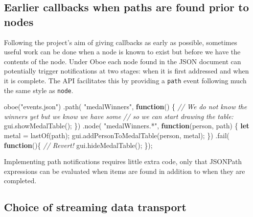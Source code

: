 \documentclass[12pt, ]{article}
\newenvironment{Shaded}{}{}
\newcommand{\KeywordTok}[1]{\textcolor[rgb]{0.00,0.44,0.13}{\textbf{{#1}}}}
\newcommand{\StringTok}[1]{\textcolor[rgb]{0.25,0.44,0.63}{{#1}}}
\newcommand{\CommentTok}[1]{\textcolor[rgb]{0.38,0.63,0.69}{\textit{{#1}}}}
\newcommand{\OtherTok}[1]{\textcolor[rgb]{0.00,0.44,0.13}{{#1}}}
\newcommand{\FunctionTok}[1]{\textcolor[rgb]{0.02,0.16,0.49}{{#1}}}
\newcommand{\NormalTok}[1]{{#1}}
\begin{document}
\subsection{Earlier callbacks when paths are found prior to
nodes}\label{earlier-callbacks-when-paths-are-found-prior-to-nodes}

Following the project's aim of giving callbacks as early as possible,
sometimes useful work can be done when a node is known to exist but
before we have the contents of the node. Under Oboe each node found in
the JSON document can potentially trigger notifications at two stages:
when it is first addressed and when it is complete. The API facilitates
this by providing a \texttt{path} event following much the same style as
\texttt{node}.

\begin{Shaded}
\begin{Highlighting}[]
\FunctionTok{oboe}\NormalTok{(}\StringTok{"events.json"}\NormalTok{)}
   \NormalTok{.}\FunctionTok{path}\NormalTok{( }\StringTok{"medalWinners"}\NormalTok{, }\KeywordTok{function}\NormalTok{() \{}
      \CommentTok{// We do not know the winners yet but we know we have some }
      \CommentTok{// so we can start drawing the table:    }
      \OtherTok{gui}\NormalTok{.}\FunctionTok{showMedalTable}\NormalTok{();}
   \NormalTok{\})}
   \NormalTok{.}\FunctionTok{node}\NormalTok{( }\StringTok{"medalWinners.*"}\NormalTok{, }\KeywordTok{function}\NormalTok{(person, path) \{    }
      \KeywordTok{let} \NormalTok{metal = }\FunctionTok{lastOf}\NormalTok{(path);}
      \OtherTok{gui}\NormalTok{.}\FunctionTok{addPersonToMedalTable}\NormalTok{(person, metal);}
   \NormalTok{\})}
   \NormalTok{.}\FunctionTok{fail}\NormalTok{( }\KeywordTok{function}\NormalTok{()\{}
      \CommentTok{// Revert!}
      \OtherTok{gui}\NormalTok{.}\FunctionTok{hideMedalTable}\NormalTok{();}
   \NormalTok{\});}
\end{Highlighting}
\end{Shaded}

Implementing path notifications requires little extra code, only that
JSONPath expressions can be evaluated when items are found in addition
to when they are completed.

\subsection{Choice of streaming data
transport}\label{choice-of-streaming-data-transport}
\end{document}
